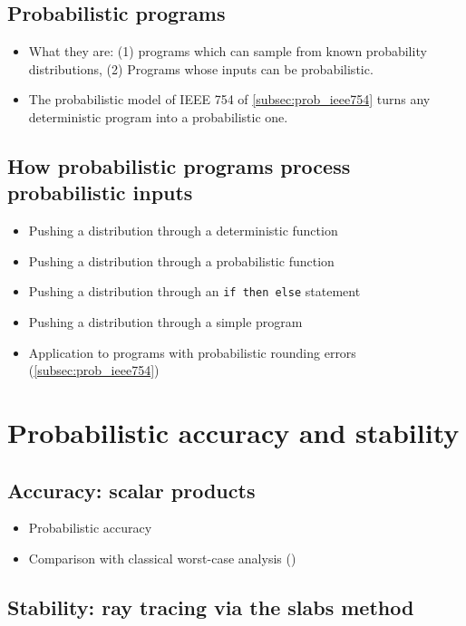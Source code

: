 \documentclass[10pt,conference]{IEEEtran}
\begin{document}
\subsection{Probabilistic programs}
\begin{itemize}
\item What they are: (1) programs which can sample from known probability distributions, (2) Programs whose inputs can be probabilistic.
\item The probabilistic model of IEEE 754 of \cref{subsec:prob_ieee754} turns any deterministic program into a probabilistic one.
\end{itemize}

\subsection{How probabilistic programs process probabilistic inputs}
\begin{itemize}
\item Pushing a distribution through a deterministic function
\item Pushing a distribution through a probabilistic function
\item Pushing a distribution through an \texttt{if then else} statement
\item Pushing a distribution through a simple program
\item Application to programs with probabilistic rounding errors (\cref{subsec:prob_ieee754})
\end{itemize}

\section{Probabilistic accuracy and stability}

\subsection{Accuracy: scalar products}

\begin{itemize}
\item Probabilistic accuracy
\item Comparison with classical worst-case analysis (\cite[3.1]{higham2002accuracy})
\end{itemize}

\subsection{Stability: ray tracing via the slabs method}



\end{document}
